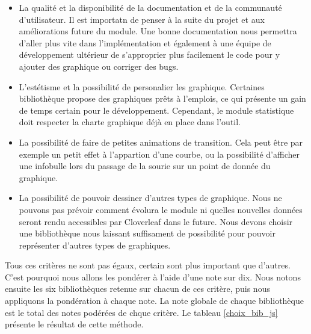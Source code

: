 			\begin{itemize}
			  \item La qualité et la disponibilité de la documentation et de la
			  communauté d'utilisateur. Il est importatn de penser à la suite du projet
			  et aux améliorations future du module. Une bonne documentation nous
			  permettra d'aller plus vite dans l'implémentation et également à une équipe
			  de développement ultérieur de s'approprier plus facilement le code pour y
			  ajouter des graphique ou corriger des bugs.
			  \item L'estétisme et la possibilité de personalier les graphique. Certaines
			  bibliothèque propose des graphiques prêts à l'emplois, ce qui présente un
			  gain de temps certain pour le développement. Cependant, le module
			  statistique doit respecter la charte graphique déjà en place dans l'outil.
			  \item La possibilité de faire de petites animations de transition. Cela
			  peut être par exemple un petit effet à l'appartion d'une courbe, ou la
			  possibilité d'afficher une infobulle lors du passage de la sourie sur un
			  point de donnée du graphique.
			  \item La possibilité de pouvoir dessiner d'autres types de graphique. Nous
			  ne pouvons pas prévoir comment évolura le module ni quelles nouvelles
			  données seront rendu accessibles par Cloverleaf dans le future. Nous devons
			  choisir une bibliothèque nous laissant suffisament de possibilité pour
			  pouvoir représenter d'autres types de graphiques.
			\end{itemize}
			Tous ces critères ne sont pas égaux, certain sont plus important que
			d'autres. C'est pourquoi nous allons les pondérer à l'aide d'une note sur
			dix. Nous notons ensuite les six bibliothèques retenue sur chacun de ces
			critère, puis nous appliquons la pondération à chaque note. La note globale
			de chaque bibliothèque est le total des notes podérées de chque critère. Le
			tableau \ref{choix_bib_js} présente le résultat de cette méthode.
